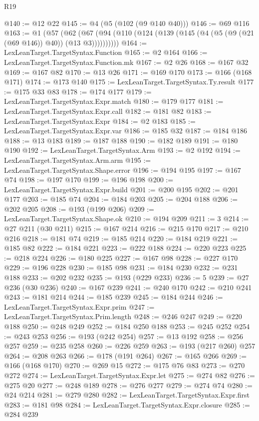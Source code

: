 \begin{lexlean}{R19}
\begin{coremodule}
@140 := @12 @22
@145 := @4 (@5 (@102 (@9 @140 @40)))
@146 := @69 @116
@163 := @1
    (@57 (@62 (@67 (@94 (@110 (@124 (@139 (@145 (@4 (@5 (@9 (@21 (@69 @146)) @40)) (@13 @3))))))))))
@164 := LexLeanTarget.TargetSyntax.Function
@165 := @2 @164
@166 := LexLeanTarget.TargetSyntax.Function.mk
@167 := @2 @26
@168 := @167 @32
@169 := @167 @82
@170 := @13 @26
@171 := @169 @170
@173 := @166 (@168 @171)
@174 := @173 @140
@175 := LexLeanTarget.TargetSyntax.Ty.result
@177 := @175 @33 @83
@178 := @174 @177
@179 := LexLeanTarget.TargetSyntax.Expr.match
@180 := @179 @177
@181 := LexLeanTarget.TargetSyntax.Expr.call
@182 := @181 @82
@183 := LexLeanTarget.TargetSyntax.Expr
@184 := @2 @183
@185 := LexLeanTarget.TargetSyntax.Expr.var
@186 := @185 @32
@187 := @184 @186
@188 := @13 @183
@189 := @187 @188
@190 := @182 @189
@191 := @180 @190
@192 := LexLeanTarget.TargetSyntax.Arm
@193 := @2 @192
@194 := LexLeanTarget.TargetSyntax.Arm.arm
@195 := LexLeanTarget.TargetSyntax.Shape.error
@196 := @194 @195
@197 := @167 @74
@198 := @197 @170
@199 := @196 @198
@200 := LexLeanTarget.TargetSyntax.Expr.build
@201 := @200 @195
@202 := @201 @177
@203 := @185 @74
@204 := @184 @203
@205 := @204 @188
@206 := @202 @205
@208 := @193 (@199 @206)
@209 := LexLeanTarget.TargetSyntax.Shape.ok
@210 := @194 @209
@211 := 3
@214 := @27 @211 (@30 @211)
@215 := @167 @214
@216 := @215 @170
@217 := @210 @216
@218 := @181 @74
@219 := @185 @214
@220 := @184 @219
@221 := @185 @82
@222 := @184 @221
@223 := @222 @188
@224 := @220 @223
@225 := @218 @224
@226 := @180 @225
@227 := @167 @98
@228 := @227 @170
@229 := @196 @228
@230 := @185 @98
@231 := @184 @230
@232 := @231 @188
@233 := @202 @232
@235 := @193 (@229 @233)
@236 := 5
@239 := @27 @236 (@30 @236)
@240 := @167 @239
@241 := @240 @170
@242 := @210 @241
@243 := @181 @214
@244 := @185 @239
@245 := @184 @244
@246 := LexLeanTarget.TargetSyntax.Expr.prim
@247 := LexLeanTarget.TargetSyntax.Prim.length
@248 := @246 @247
@249 := @220 @188
@250 := @248 @249
@252 := @184 @250 @188
@253 := @245 @252
@254 := @243 @253
@256 := @193 (@242 @254)
@257 := @13 @192
@258 := @256 @257
@259 := @235 @258
@260 := @226 @259
@263 := @193 (@217 @260) @257
@264 := @208 @263
@266 := @178 (@191 @264)
@267 := @165 @266
@269 := @166 (@168 @170)
@270 := @269 @15
@272 := @175 @76 @83
@273 := @270 @272
@274 := LexLeanTarget.TargetSyntax.Expr.let
@275 := @274 @82
@276 := @275 @20
@277 := @248 @189
@278 := @276 @277
@279 := @274 @74
@280 := @24 @214
@281 := @279 @280
@282 := LexLeanTarget.TargetSyntax.Expr.first
@283 := @181 @98
@284 := LexLeanTarget.TargetSyntax.Expr.closure
@285 := @284 @239

\end{coremodule}
\end{lexlean}
